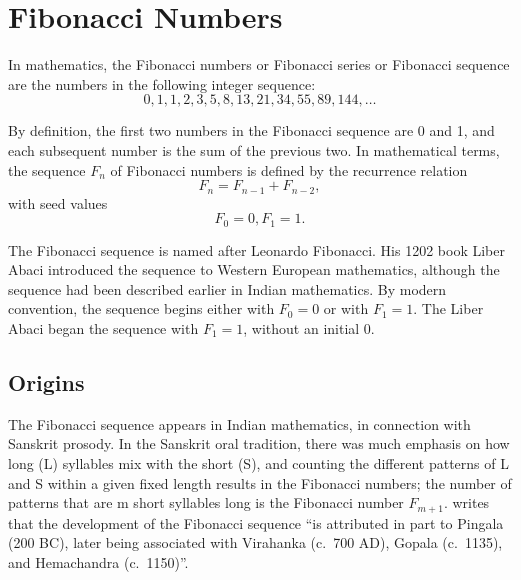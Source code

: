 \chapter{Fibonacci Numbers}

In mathematics, the Fibonacci numbers or Fibonacci series or Fibonacci sequence are the numbers in the following integer sequence:
%
\begin{equation*} %
0, 1, 1, 2, 3,5,8,13,21,34,55,89,144,\ldots
\end{equation*}

By definition, the first two numbers in the Fibonacci sequence are 0 and 1, and each subsequent number is the sum of the previous two. In mathematical terms, the sequence $F_n$ of Fibonacci numbers is defined by the recurrence relation
%
\begin{equation}
F_n = F_{n-1} + F_{n-2},
\end{equation}
%
with seed values
%
\begin{equation}
F_0 = 0, F_1 = 1.
\end{equation}

The Fibonacci sequence is named after Leonardo Fibonacci. His 1202 book Liber Abaci introduced the sequence to Western European mathematics, although the sequence had been described earlier in Indian mathematics. \cite{Goonatilake:1998} By modern convention, the sequence begins either with $F_0 = 0$ or with $F_1 = 1$. The Liber Abaci began the sequence with $F_1 = 1$, without an initial 0.


\section{Origins}

The Fibonacci sequence appears in Indian mathematics, in connection with Sanskrit prosody. \cite{Singh:1985} In the Sanskrit oral tradition, there was much emphasis on how long (L) syllables mix with the short (S), and counting the different patterns of L and S within a given fixed length results in the Fibonacci numbers; the number of patterns that are m short syllables long is the Fibonacci number $F_{m + 1}$.
\citet{Goonatilake:1998} writes that the development of the Fibonacci sequence ``is attributed in part to Pingala (200 BC), later being associated with Virahanka (c.~700 AD), Gopala (c.~1135), and Hemachandra (c.~1150)''.  

